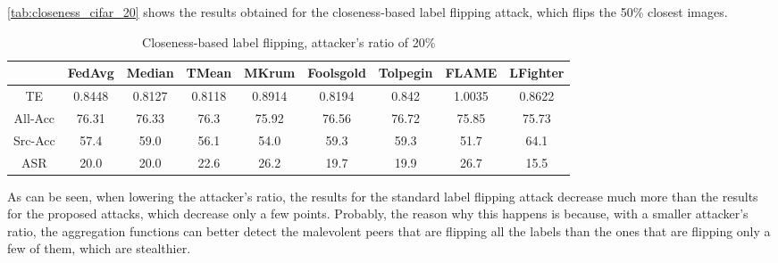 \autoref{tab:closeness_cifar_20} shows the results obtained for the closeness-based label flipping attack, which flips the 50\% closest images. 

\begin{table}[h!]
        \centering
        \small
        \begin{adjustbox}{center}
        \begin{tabular}{|c|c|c|c|c|c|c|c|c|}
            \hline
            & FedAvg & Median & TMean & MKrum & Foolsgold & Tolpegin & FLAME & LFighter \\
            \hline
            TE & 0.8448 & 0.8127 & 0.8118 & 0.8914 & 0.8194 & 0.842 & 1.0035 & 0.8622 \\
            \hline
            All-Acc & 76.31 & 76.33 & 76.3 & 75.92 & 76.56 & 76.72 & 75.85 & 75.73 \\
            \hline
            Src-Acc & 57.4 & 59.0 & 56.1 & 54.0 & 59.3 & 59.3 & 51.7 & 64.1 \\
            \hline
            ASR & 20.0 & 20.0 & 22.6 & 26.2 & 19.7 & 19.9 & 26.7 & 15.5 \\
            \hline
        \end{tabular}
        \end{adjustbox}
        \caption{Closeness-based label flipping, attacker's ratio of 20\%}
        \label{tab:closeness_cifar_20}
    \end{table}

As can be seen, when lowering the attacker's ratio, the results for the standard label flipping attack decrease much more than the results for the proposed attacks, which decrease only a few points. Probably, the reason why this happens is because, with a smaller attacker's ratio, the aggregation functions can better detect the malevolent peers that are flipping all the labels than the ones that are flipping only a few of them, which are stealthier.

